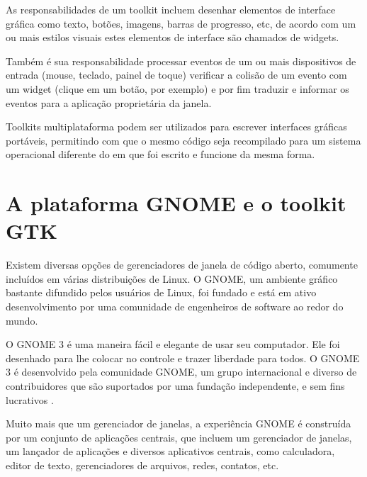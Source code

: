 As responsabilidades de um toolkit incluem desenhar elementos de interface
gráfica como texto, botões, imagens, barras de progresso, etc, de acordo com um
ou mais estilos visuais estes elementos de interface são chamados de widgets.

Também é sua responsabilidade processar eventos de um ou mais dispositivos de
entrada (mouse, teclado, painel de toque) verificar a colisão de um evento com
um widget (clique em um botão, por exemplo) e por fim traduzir e informar os
eventos para a aplicação proprietária da janela.

Toolkits multiplataforma podem ser utilizados para escrever interfaces gráficas
portáveis, permitindo com que o mesmo código seja recompilado para um sistema
operacional diferente do em que foi escrito e funcione da mesma forma.

\section{A plataforma GNOME e o toolkit GTK}

Existem diversas opções de gerenciadores de janela de código aberto, comumente
incluídos em várias distribuições de Linux. O GNOME, um ambiente gráfico
bastante difundido pelos usuários de Linux, foi fundado e está em ativo
desenvolvimento por uma comunidade de engenheiros de software ao redor do mundo.

\begin{citacao}
    O GNOME 3 é uma maneira fácil e elegante de usar seu computador.
    Ele foi desenhado para lhe colocar no controle e trazer liberdade para 
    todos. O GNOME 3 é desenvolvido pela comunidade GNOME, um grupo
    internacional e diverso de contribuidores que são suportados por uma
    fundação independente, e sem fins lucrativos \cite{gnome-org}.
\end{citacao}

Muito mais que um gerenciador de janelas, a experiência GNOME é construída por
um conjunto de aplicações centrais, que incluem um gerenciador de janelas, um
lançador de aplicações e diversos aplicativos centrais, como calculadora,
editor de texto, gerenciadores de arquivos, redes, contatos, etc.

